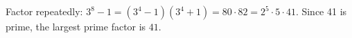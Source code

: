 Factor repeatedly: $3^8-1=(3^4-1)(3^4+1)=80\cdot82=2^5\cdot5\cdot41$. Since 41 is prime, the largest prime factor is $\boxed{41}$.
